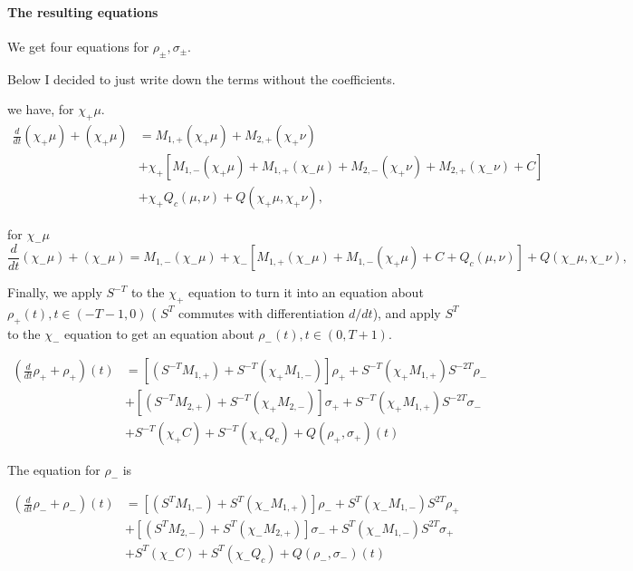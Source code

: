 \documentclass[letterpaper,11pt]{article}
\numberwithin{equation}{section}
\theoremstyle{plain}
\begin{document}
\paragraph{The resulting equations}

We get four equations for $\rho_{\pm}, \sigma_{\pm}$.


Below I decided to just write down the terms without the 
coefficients.


we have, for $\chi_+\mu$. 
\begin{align*}
\frac{d}{dt} (\chi_+\mu) + (\chi_+\mu ) &= M_{1,+}(\chi_+\mu)+M_{2,+}(\chi_+\nu)\\
&+\chi_+[M_{1,-}(\chi_+\mu)+M_{1,+}(\chi_-\mu)
+M_{2,-}(\chi_+\nu)+M_{2,+}(\chi_-\nu)+C] \\
&+ \chi_+Q_c(\mu,\nu)+Q(\chi_+\mu,\chi_+\nu),
\end{align*}


for $\chi_-\mu$
\[
\frac{d}{dt} (\chi_-\mu) + (\chi_-\mu ) = M_{1,-}(\chi_-\mu)+\chi_-[M_{1,+}(\chi_-\mu)+M_{1,-}(\chi_+\mu)
+C+ Q_c(\mu,\nu)]+Q(\chi_-\mu,\chi_-\nu),
\]

Finally, we apply $S^{-T}$ to the $\chi_+$ equation to turn it into an equation about $\rho_+(t), t\in (-T-1,0)$ ( $S^T$ commutes with differentiation $d/dt$), and apply $S^T$ to the $\chi_-$ equation to get an equation about $\rho_-(t), t \in (0,T+1)$.

\begin{align*}
\left(\frac{d}{dt} \rho_+ + \rho_+\right)(t) &= [(S^{-T}M_{1,+})+S^{-T}(\chi_+M_{1,-})]\rho_+ + S^{-T}(\chi_+M_{1,+})S^{-2T}\rho_-\\
&+[(S^{-T}M_{2,+})+S^{-T}(\chi_+M_{2,-})]\sigma_+ + S^{-T}(\chi_+M_{1,+})S^{-2T}\sigma_-\\
& + S^{-T}(\chi_+C)+S^{-T}(\chi_+Q_c) + Q(\rho_+,\sigma_+)(t)
\end{align*}

The equation for $\rho_-$ is

\begin{align*}
\left(\frac{d}{dt} \rho_- + \rho_-\right)(t) &= [(S^{T}M_{1,-})+S^{T}(\chi_-M_{1,+})]\rho_- + S^{T}(\chi_-M_{1,-})S^{2T}\rho_+\\
&+[(S^{T}M_{2,-})+S^{T}(\chi_-M_{2,+})]\sigma_- + S^{T}(\chi_-M_{1,-})S^{2T}\sigma_+\\
& + S^{T}(\chi_-C)+S^{T}(\chi_-Q_c) + Q(\rho_-,\sigma_-)(t)
\end{align*}
\end{document}
